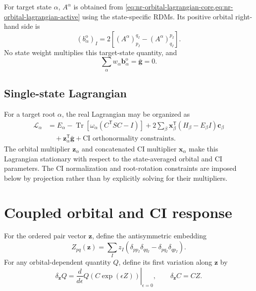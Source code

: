 \documentclass[aip,preprint,nofootinbib]{revtex4-1}
\newcommand{\Tr}{\operatorname{Tr}}
\begin{document}
For target state $\alpha$, $A^\alpha$ is obtained from
\cref{eq:nr-orbital-lagrangian-core,eq:nr-orbital-lagrangian-active} using
the state-specific RDMs.  Its positive orbital right-hand side is
\begin{equation}
 \boxed{
 (b^\mathrm{o}_\alpha)_I
 =2\left[(A^\alpha)^{q_I}_{p_I}-(A^\alpha)^{p_I}_{q_I}\right]
 }.
 \label{eq:nr-orbital-b}
\end{equation}
No state weight multiplies this target-state quantity, and
\begin{equation}
 \sum_\alpha w_\alpha\mathbf b^\mathrm{o}_\alpha
 =\bar{\mathbf g}=0.
\end{equation}

\subsection{Single-state Lagrangian}

For a target root $\alpha$, the real Lagrangian may be organized as
\begin{align}
 \mathcal L_\alpha
 &=E_\alpha
 -\Tr\!\left[\omega_\alpha(C^{\mathsf T}SC-I)\right]
 +2\sum_\beta\mathbf x_\beta^{\mathsf T}
  (H_\beta-E_\beta I)\mathbf c_\beta
 \nonumber\\
 &\quad+\mathbf z_\alpha^{\mathsf T}\bar{\mathbf g}
 +\text{CI orthonormality constraints}.
 \label{eq:nr-lagrangian}
\end{align}
The orbital multiplier $\mathbf z_\alpha$ and concatenated CI multiplier
$\mathbf x_\alpha$ make this Lagrangian stationary with respect to the
state-averaged orbital and CI parameters.  The CI normalization and
root-rotation constraints are imposed below by projection rather than by
explicitly solving for their multipliers.

\section{Coupled orbital and CI response}

For the ordered pair vector $\mathbf z$, define the antisymmetric embedding
\begin{equation}
 Z_{pq}(\mathbf z)=\sum_Iz_I
 \left(\delta_{p p_I}\delta_{q q_I}
      -\delta_{p q_I}\delta_{q p_I}\right).
 \label{eq:nr-vector-embedding}
\end{equation}
For any orbital-dependent quantity $Q$, define its first variation along
$\mathbf z$ by
\begin{equation}
 \delta_{\mathbf z}Q
 =\left.\frac{d}{d\epsilon}
 Q\!\left(C\exp(\epsilon Z)\right)\right|_{\epsilon=0},
 \qquad
 \delta_{\mathbf z}C=CZ.
 \label{eq:nr-orbital-direction}
\end{equation}
\end{document}
